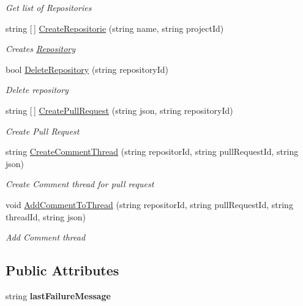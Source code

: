 \begin{DoxyCompactItemize}
\begin{DoxyCompactList}\small\item\em Get list of Repositories \end{DoxyCompactList}\item 
string \mbox{[}$\,$\mbox{]} \mbox{\hyperlink{class_vsts_rest_a_p_i_1_1_git_1_1_repository_a2623c37a03e528aa6e0dd4f7bcac3a04}{Create\+Repositorie}} (string name, string project\+Id)
\begin{DoxyCompactList}\small\item\em Creates \mbox{\hyperlink{class_vsts_rest_a_p_i_1_1_git_1_1_repository}{Repository}} \end{DoxyCompactList}\item 
bool \mbox{\hyperlink{class_vsts_rest_a_p_i_1_1_git_1_1_repository_ae9bdfeecb8846a51d3900752166d6d74}{Delete\+Repository}} (string repository\+Id)
\begin{DoxyCompactList}\small\item\em Delete repository \end{DoxyCompactList}\item 
string \mbox{[}$\,$\mbox{]} \mbox{\hyperlink{class_vsts_rest_a_p_i_1_1_git_1_1_repository_af74451a9ec41478f8a16fdb498ea96a0}{Create\+Pull\+Request}} (string json, string repository\+Id)
\begin{DoxyCompactList}\small\item\em Create Pull Request \end{DoxyCompactList}\item 
string \mbox{\hyperlink{class_vsts_rest_a_p_i_1_1_git_1_1_repository_a9284efc83831e33d74892b68ff58b276}{Create\+Comment\+Thread}} (string repositor\+Id, string pull\+Request\+Id, string json)
\begin{DoxyCompactList}\small\item\em Create Comment thread for pull request \end{DoxyCompactList}\item 
void \mbox{\hyperlink{class_vsts_rest_a_p_i_1_1_git_1_1_repository_a5c50b0035797a2b59071162bff47135c}{Add\+Comment\+To\+Thread}} (string repositor\+Id, string pull\+Request\+Id, string thread\+Id, string json)
\begin{DoxyCompactList}\small\item\em Add Comment thread \end{DoxyCompactList}\end{DoxyCompactItemize}
\subsection*{Public Attributes}
\begin{DoxyCompactItemize}
\item 
\mbox{\label{class_vsts_rest_a_p_i_1_1_git_1_1_repository_ad6665ada35d88c15727b7b9b1c21e687}} 
string {\bfseries last\+Failure\+Message}
\end{DoxyCompactItemize}


